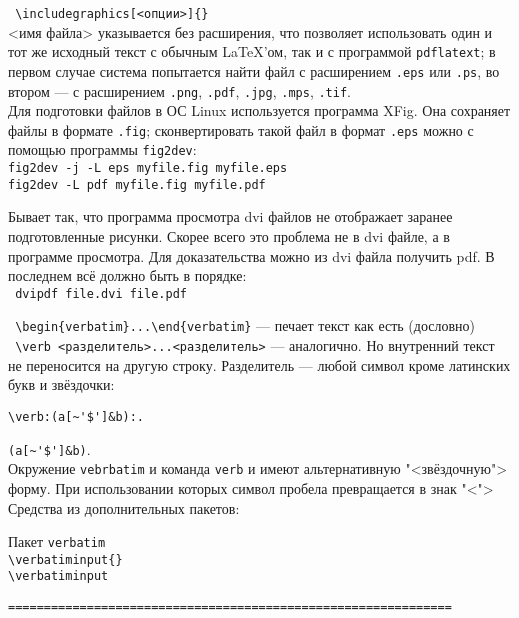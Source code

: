 \noindent
\texttt{
\textbackslash includegraphics[<опции>]\{<имя файла>\}}\\
<имя файла> указывается без расширения, что позволяет использовать один и тот же исходный текст с обычным \LaTeX'ом, так и с программой \texttt{pdflatext}; в первом случае система попытается найти файл с расширением \texttt{.eps} или \texttt{.ps}, во втором --- с расширением \texttt{.png}, \texttt{.pdf}, \texttt{.jpg}, \texttt{.mps}, \texttt{.tif}.\\
Для подготовки файлов в ОС Linux используется программа XFig. Она сохраняет файлы в формате \texttt{.fig}; сконвертировать такой файл в формат \texttt{.eps} можно с помощью программы \texttt{fig2dev}:\\
\texttt{fig2dev -j -L eps myfile.fig myfile.eps}\\
\texttt{fig2dev -L pdf myfile.fig myfile.pdf}\\
\medskip

\noindent
Бывает так, что программа просмотра dvi файлов не отображает заранее подготовленные рисунки. Скорее всего это проблема не в dvi файле, а в программе просмотра. Для доказательства можно из dvi файла получить pdf. В последнем всё должно быть в порядке:\\
\texttt{
   dvipdf  file.dvi file.pdf}

\noindent
\texttt{
\textbackslash begin\{verbatim\}...\textbackslash end\{verbatim\}} --- печает текст как есть (дословно)\\
\texttt{
\textbackslash verb <разделитель>...<разделитель>} --- аналогично. Но внутренний текст не переносится на другую строку. Разделитель --- любой символ кроме латинских букв и звёздочки:
\begin{verbatim}
\verb:(a[~'$']&b):.
\end{verbatim}
\verb:(a[~'$']&b):.\\
Окружение \texttt{vebrbatim} и команда \texttt{verb} и имеют альтернативную "<звёздочную"> форму. При использовании которых символ пробела превращается в знак "<\textvisiblespace">\\
Средства из дополнительных пакетов:\\
\medskip

\noindent
Пакет \texttt{verbatim}\\
\texttt{\textbackslash verbatiminput\{<имя файла>\}}
\\
\texttt{\textbackslash verbatiminput}

\texttt{==============================================================}

